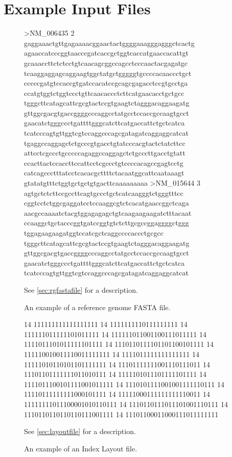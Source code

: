 \documentclass[a4paper,12pt]{book}
\newcommand{\rGFF}{reference genome FASTA file}
\begin{document}
\section{Example Input Files}
\label{sec:examplefiles}
\begin{figure}
	\centering
	\begin{boxedverbatim}
	>NM_006435 2
	gaggaaactgttgagaaaacggaactactggggaaagggagggctcactg
	agaaccatcccggtaacccgatcaccgctggtcaccatgaaccacattgt
	gcaaaccttctctcctgtcaacagcggccagcctcccaactacgagatgc
	tcaaggaggagcaggaagtggctatgctgggggtgccccacaaccctgct
	cccccgatgtccaccgtgatccacatccgcagcgagacctccgtgcctga
	ccatgtggtctggtccctgttcaacaccctcttcatgaacacctgctgcc
	tgggcttcatagcattcgcgtactccgtgaagtctagggacaggaagatg
	gttggcgacgtgaccggggcccaggcctatgcctccaccgccaagtgcct
	gaacatctgggccctgattttgggcatcttcatgaccattctgctcatca
	tcatcccagtgttggtcgtccaggcccagcgatagatcaggaggcatcat
	tgaggccaggagctctgcccgtgacctgtatcccacgtactctatcttcc
	attcctcgccctgcccccagaggccaggagctctgcccttgacctgtatt
	ccacttactccaccttccattcctcgccctgtccccacagccgagtcctg
	catcagccctttatcctcacacgcttttctacaatggcattcaataaagt
	gtatatgtttctggtgctgctgtgacttcaaaaaaaaa
	>NM_015644 3
	agtgctctcttccgccttcagtgccctgctcatcaagggtctgggtttcc
	cggtcctctggcgaggatcctccaaggcgtctcacatgaaccggctcaga
	aacgccaaaatctacgtggagagagctgtcaagaagaagatctttacaat
	ccaaggctgctacccggtgatccggtgtctcttgcgccggaggggctggg
	tggagaagaagatggtccatcgctcaggccccaccctgcgcc
	tgggcttcatagcattcgcgtactccgtgaagtctagggacaggaagatg
	gttggcgacgtgaccggggcccaggcctatgcctccaccgccaagtgcct
	gaacatctgggccctgattttgggcatcttcatgaccattctgctcatca
	tcatcccagtgttggtcgtccaggcccagcgatagatcaggaggcatcat
	\end{boxedverbatim}
	\caption{
	An example of a \rGFF{}.
	}{
	See \autoref{sec:rgfastafile} for a description.
	\label{fig:rgfastafile}
	}
\end{figure}
\begin{figure}
	\centering
	\begin{boxedverbatim}
	14 111111111111111111
	14 1111111110111111111
	14 111111011111101011111
	14 111111011001100111011111
	14 1111011101011111101111
	14 1110110111101101100101111
	14 111110010011110011111111
	14 1111011111111111111
	14 11111010110101101111111
	14 11101111111001110111011
	14 11101101111111011010111
	14 1111101011101111101111
	14 1111011100101111001011111
	14 1110101111001001111110111
	14 11110111111111000101111
	14 11111000111111111110011
	14 11111111011100001010110111
	14 1110110111011101001110111
	14 1110110110110110111001111
	14 11101100011000111011111111
	\end{boxedverbatim}
	\caption{
	An example of an Index Layout file.
	}{
	See \autoref{sec:layoutfile} for a description.
	\label{fig:layoutfile}
	}
\end{figure}
\end{document}
